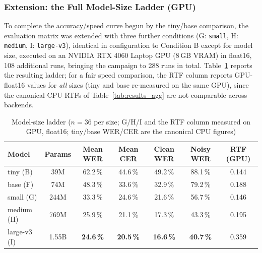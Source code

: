 \documentclass[12pt]{report}
\begin{document}
\subsubsection*{Extension: the Full Model-Size Ladder (GPU)}
To complete the accuracy/speed curve begun by the tiny/base comparison, the evaluation matrix was extended with three further conditions (G: \texttt{small}, H: \texttt{medium}, I: \texttt{large-v3}), identical in configuration to Condition B except for model size, executed on an NVIDIA RTX 4060 Laptop GPU (8\,GB VRAM) in float16, 108 additional runs, bringing the campaign to 288 runs in total. Table~\ref{tab:ladder} reports the resulting ladder; for a fair speed comparison, the RTF column reports GPU-float16 values for \emph{all} sizes (tiny and base re-measured on the same GPU), since the canonical CPU RTFs of Table~\ref{tab:results_agg} are not comparable across backends.
\begin{table}[H]
\centering
\small
\setlength{\tabcolsep}{3.5pt}%
\begin{tabular}{|l|c|c|c|c|c|c|}
\hline
\textbf{Model} & \textbf{Params} & \textbf{Mean WER} & \textbf{Mean CER} & \textbf{Clean WER} & \textbf{Noisy WER} & \textbf{RTF (GPU)} \\ \hline
tiny (B) & 39M & 62.2\,\% & 44.6\,\% & 49.2\,\% & 88.1\,\% & 0.144 \\ \hline
base (F) & 74M & 48.3\,\% & 33.6\,\% & 32.9\,\% & 79.2\,\% & 0.188 \\ \hline
small (G) & 244M & 33.3\,\% & 24.6\,\% & 21.6\,\% & 56.7\,\% & 0.146 \\ \hline
medium (H) & 769M & 25.9\,\% & 21.1\,\% & 17.3\,\% & 43.3\,\% & 0.195 \\ \hline
large-v3 (I) & 1.55B & \textbf{24.6\,\%} & \textbf{20.5\,\%} & \textbf{16.6\,\%} & \textbf{40.7\,\%} & 0.359 \\ \hline
\end{tabular}
\caption{Model-size ladder ($n=36$ per size; G/H/I and the RTF column measured on GPU, float16; tiny/base WER/CER are the canonical CPU figures)}
\label{tab:ladder}
\end{table}
\end{document}
